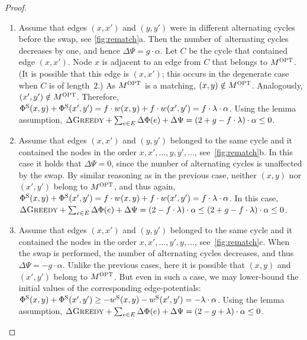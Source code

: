 \begin{proof}
\begin{enumerate}

\item
Assume that edges $(x,x')$ and $(y,y')$ were in different alternating
cycles before the swap, see \ref{fig:rematch}a. Then the number
of~alternating cycles decreases by one, and hence $\Delta \Psi = g \cdot
\alpha$. Let $C$ be the cycle that contained edge $(x,x')$. Node $x$ is adjacent
to an edge from $C$ that belongs to $M^\textsc{OPT}$. (It is possible that this edge is
$(x,x')$; this occurs in the degenerate case when $C$ is of length~$2$.) As
$M^\textsc{OPT}$ is a matching, $(x,y) \notin M^\textsc{OPT}$. Analogously, $(x',y') \notin
M^\textsc{OPT}$. Therefore, $\Phi^\textrm{S}(x,y) + \Phi^\textrm{S}(x',y') = f \cdot w(x,y) + f \cdot
w(x',y') = f \cdot \lambda \cdot \alpha$. Using the lemma assumption,
$\Delta \textsc{Greedy} + \sum_{e \in E} \Delta \Phi(e) + \Delta\Psi = (2 + g - f
\cdot \lambda) \cdot \alpha \leq 0$.

\item
Assume that edges $(x,x')$ and $(y,y')$ belonged to the same cycle and
it contained the nodes in the order $x,x',\ldots,y,y',\ldots$,
see~\ref{fig:rematch}b. In this case it holds that 
$\Delta \Psi = 0$, since 
the number of alternating cycles is unaffected by the swap. By similar
reasoning as in the previous case, neither $(x,y)$ nor $(x',y')$ belong to
$M^\textsc{OPT}$, and thus again, $\Phi^\textrm{S}(x,y) + \Phi^\textrm{S}(x',y') = f \cdot w(x,y) + f
\cdot w(x',y') = f \cdot \lambda \cdot \alpha$. In this case, $\Delta \textsc{Greedy}
+ \sum_{e \in E} \Delta \Phi(e) + \Delta\Psi = (2 - f \cdot \lambda) \cdot
\alpha \leq (2 + g - f \cdot \lambda) \cdot \alpha \leq 0$.

\item 
Assume that edges $(x,x')$ and $(y,y')$ belonged to the same cycle and
it contained the nodes in the order $x,x',\ldots,y',y,\ldots$,
see~\ref{fig:rematch}c. When the swap is performed, the number of
alternating cycles decreases, and thus $\Delta \Psi = -g \cdot \alpha$. Unlike
the previous cases, here it is possible that $(x,y)$ and $(x',y')$ belong to
$M^\textsc{OPT}$. But even in such a case, we may lower-bound the initial values of the
corresponding edge-potentials: $\Phi^\textrm{S}(x,y) + \Phi^\textrm{S}(x',y') \geq -
w^\textrm{S}(x,y) - w^\textrm{S}(x',y') = - \lambda \cdot \alpha$. Using the lemma
assumption, $\Delta \textsc{Greedy} + \sum_{e \in E} \Delta \Phi(e) + \Delta\Psi = (2
- g + \lambda) \cdot \alpha \leq 0$.
\end{enumerate}

\end{proof}




